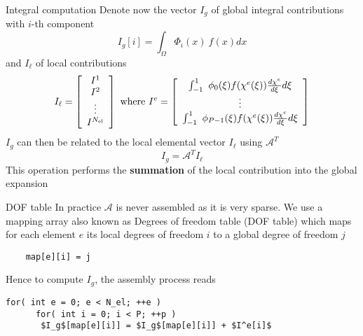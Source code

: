 \begin{frame}{Integral computation}
  Denote now the vector $I_g$ of global integral contributions with $i$-th component
  \begin{equation}
    \label{eq:54}
    I_g[i] = \int_\Omega \Phi_i(x)\ f(x) dx
  \end{equation}
  and $I_\ell$ of local contributions
  \begin{equation}
    \label{eq:55}
    I_\ell = \left[
      \begin{array}[c]{c}
        I^1\\
        I^2\\
        \vdots\\
        I^{N_\text{el}}
      \end{array}\right]
    \text{ where }
    I^e =  \left[
      \begin{array}[c]{c}
        \int_{-1}^1\ \phi_0(\xi) f(\chi^e(\xi)) \frac{d \chi^e}{d \xi} d\xi\\
        \vdots\\
        \int_{-1}^1\ \phi_{P-1}(\xi) f(\chi^e(\xi)) \frac{d \chi^e}{d \xi} d\xi
      \end{array}\right]
  \end{equation}
  $I_g$ can then be related to the local elemental vector $I_\ell$ using $\mathcal{A}^T$
  \begin{equation}
    \label{eq:56}
    I_g = \mathcal{A}^T I_\ell
  \end{equation}
  This operation performs the \textbf{summation} of the local contribution into the global expansion
\end{frame}

\begin{frame}[containsverbatim]{DOF table}
  In practice $\mathcal{A}$ is \alert{never assembled} as it is very
  sparse. We use a mapping array also known as Degrees of freedom
  table (DOF table) which maps for each element $e$ its local degrees
  of freedom $i$ to a global degree of freedom $j$
  \begin{lstlisting}
    map[e][i] = j
  \end{lstlisting}

  Hence to compute $I_g$, the assembly process reads
  \begin{lstlisting}[mathescape,texcl]
    for( int e = 0; e < N_el; ++e )
      for( int i = 0; i < P; ++p )
       $I_g$[map[e][i]] = $I_g$[map[e][i]] + $I^e[i]$
  \end{lstlisting}
\end{frame}

